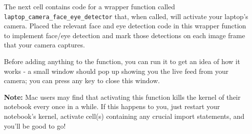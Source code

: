 \documentclass[11pt]{article}
\begin{document}
The next cell contains code for a wrapper function called
\texttt{laptop\_camera\_face\_eye\_detector} that, when called, will
activate your laptop's camera. Placed the relevant face and eye
detection code in this wrapper function to implement face/eye detection
and mark those detections on each image frame that your camera captures.

Before adding anything to the function, you can run it to get an idea of
how it works - a small window should pop up showing you the live feed
from your camera; you can press any key to close this window.

\textbf{Note:} Mac users may find that activating this function kills
the kernel of their notebook every once in a while. If this happens to
you, just restart your notebook's kernel, activate cell(s) containing
any crucial import statements, and you'll be good to go!
\end{document}
